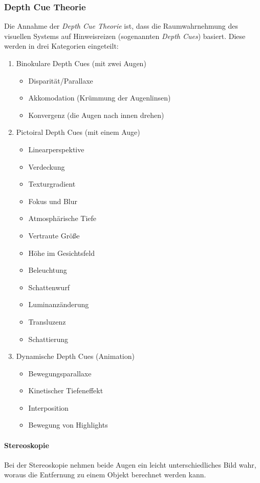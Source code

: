 			\subsubsection{Depth Cue Theorie}
				Die Annahme der \emph{Depth Cue Theorie} ist, dass die Raumwahrnehmung des visuellen Systems auf Hinweisreizen (sogenannten \emph{Depth Cues}) basiert. Diese werden in drei Kategorien eingeteilt:
				\begin{enumerate}
					\item Binokulare Depth Cues (mit zwei Augen)
						\begin{itemize}
							\item Disparität/Parallaxe
							\item Akkomodation (Krümmung der Augenlinsen)
							\item Konvergenz (die Augen nach innen drehen)
						\end{itemize}
					\item Pictoiral Depth Cues (mit einem Auge)
						\begin{itemize}
							\item Linearperspektive
							\item Verdeckung
							\item Texturgradient
							\item Fokus und Blur
							\item Atmosphärische Tiefe
							\item Vertraute Größe
							\item Höhe im Gesichtsfeld
							\item Beleuchtung
							\item Schattenwurf
							\item Luminanzänderung
							\item Transluzenz
							\item Schattierung
						\end{itemize}
					\item Dynamische Depth Cues (Animation)
						\begin{itemize}
							\item Bewegungsparallaxe
							\item Kinetischer Tiefeneffekt
							\item Interposition
							\item Bewegung von Highlights
						\end{itemize}
				\end{enumerate}

				\paragraph{Stereoskopie}
					Bei der Stereoskopie nehmen beide Augen ein leicht unterschiedliches Bild wahr, woraus die Entfernung zu einem Objekt berechnet werden kann.

